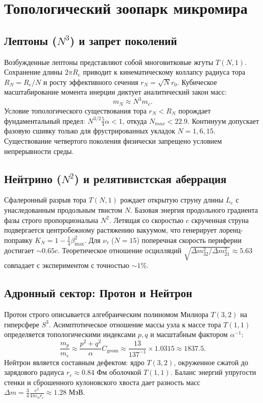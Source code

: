 \documentclass[12pt,a4paper]{article}
\begin{document}
\section{Топологический зоопарк микромира}

\subsection{Лептоны ($N^3$) и запрет поколений}
Возбужденные лептоны представляют собой многовитковые жгуты $T(N,1)$. Сохранение длины $2\pi R_e$ приводит к кинематическому коллапсу радиуса тора $R_N = R_e/N$ и росту эффективного сечения $r_N = \sqrt{N}r_0$. Кубическое масштабирование момента инерции диктует аналитический закон масс:
\begin{equation}
m_N \approx N^3 m_e.
\end{equation}
Условие топологического существования тора $r_N < R_N$ порождает фундаментальный предел: $N^{3/2} \frac{5}{4}\alpha < 1$, откуда $N_{max} < 22.9$. Континуум допускает фазовую сшивку только для фрустрированных укладок $N=1, 6, 15$. Существование четвертого поколения физически запрещено условием непрерывности среды.

\subsection{Нейтрино ($N^2$) и релятивистская аберрация}
Сфалеронный разрыв тора $T(N,1)$ рождает открытую струну длины $L_e$ с унаследованным продольным твистом $N$. Базовая энергия продольного градиента фазы строго пропорциональна $N^2$. Летящая со скоростью $c$ скрученная струна подвергается центробежному растяжению вакуумом, что генерирует лоренц-поправку $K_N = 1 - \frac{1}{4}\beta_{\text{max}}^2$. Для $\nu_\tau$ ($N=15$) поперечная скорость периферии достигает $\sim 0.65 c$. Теоретическое отношение осцилляций $\sqrt{\Delta m^2_{32} / \Delta m^2_{21}} \approx 5.63$ совпадает с экспериментом с точностью $\sim 1\%$.

\subsection{Адронный сектор: Протон и Нейтрон}
Протон строго описывается алгебраическим полиномом Милнора $T(3,2)$ на гиперсфере $S^3$. Асимптотическое отношение массы узла к массе тора $T(1,1)$ определяется топологическими индексами $p,q$ и масштабным фактором $\alpha^{-1}$:
\begin{equation}
\frac{m_p}{m_e} \approx \frac{p^2 + q^2}{\alpha} C_{\text{geom}} \approx \frac{13}{137^{-1}} \times 1.0315 \approx 1837.5.
\end{equation}
Нейтрон является составным дефектом: ядро $T(3,2)$, окруженное сжатой до зарядового радиуса $r_c \approx 0.84$ Фм оболочкой $T(1,1)$. Баланс энергий упругости стенки и сброшенного кулоновского хвоста дает разность масс $\Delta m = \frac{3}{4} \frac{e^2}{4\pi\varepsilon_0 r_c} \approx 1.28$ МэВ.
\end{document}
